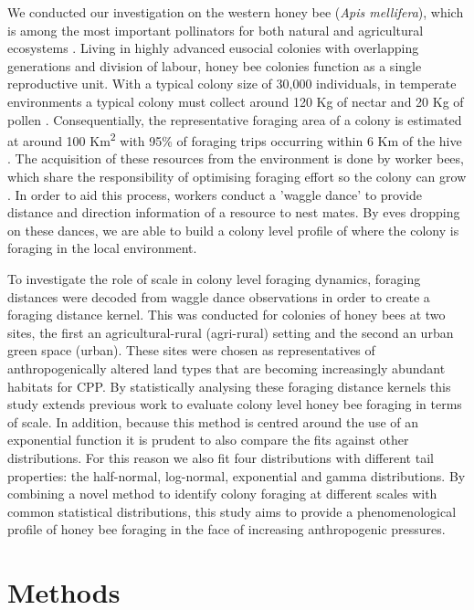 \documentclass[11pt,usenames,dvipsnames]{article}
\begin{document}
We conducted our investigation on the western honey bee (\textit{Apis mellifera}), which is among the most important pollinators for both natural and agricultural ecosystems \citep{Albrecht2018}. Living in highly advanced eusocial colonies with overlapping generations and division of labour, honey bee colonies function as a single reproductive unit. With a typical colony size of 30,000 individuals, in temperate environments a typical colony must collect around 120 Kg of nectar and 20 Kg of pollen \citep{Seeley1995}. Consequentially, the representative foraging area of a colony is estimated at around 100 Km\textsuperscript{2} with 95\% of foraging trips occurring within 6 Km of the hive \citep{Samuelson2017}. The acquisition of these resources from the environment is done by worker bees, which share the responsibility of optimising foraging effort so the colony can grow \citep{Samuelson2017}. In order to aid this process, workers conduct a 'waggle dance' to provide distance and direction information of a resource to nest mates. By eves dropping on these dances, we are able to build a colony level profile of where the colony is foraging in the local environment.

To investigate the role of scale in colony level foraging dynamics, foraging distances were decoded from waggle dance observations in order to create a foraging distance kernel. This was conducted for colonies of honey bees at two sites, the first an agricultural-rural (agri-rural) setting and the second an urban green space (urban). These sites were chosen as representatives of anthropogenically altered land types that are becoming increasingly abundant habitats for CPP. By statistically analysing these foraging distance kernels this study extends previous work to evaluate colony level honey bee foraging in terms of scale. In addition, because this method is centred around the use of an exponential function it is prudent to also compare the fits against other distributions. For this reason we also fit four distributions with different tail properties: the half-normal, log-normal, exponential and gamma distributions. By combining a novel method to identify colony foraging at different scales with common statistical distributions, this study aims to provide a phenomenological profile of honey bee foraging in the face of increasing anthropogenic pressures.

\section{Methods}
\end{document}
